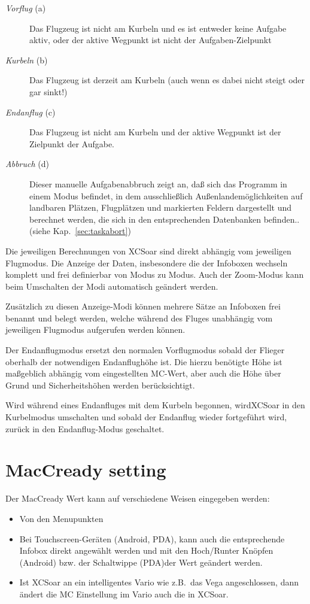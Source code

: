 \begin{description}
\item[\textit{Vorflug}  (a)]   Das Flugzeug ist nicht am Kurbeln  und es ist entweder keine Aufgabe aktiv, oder
der aktive Wegpunkt ist nicht der Aufgaben-Zielpunkt
\item[\textit{Kurbeln} (b)]  Das Flugzeug ist derzeit am Kurbeln (auch wenn es dabei nicht steigt oder gar sinkt!)
\item[\textit{Endanflug} (c)]  Das Flugzeug ist nicht am Kurbeln und der aktive Wegpunkt ist der Zielpunkt der Aufgabe.
\item[\textit{Abbruch} (d)]  Dieser manuelle Aufgabenabbruch zeigt an, daß sich das Programm in einem  Modus befindet, in dem ausschließlich Außenlandemöglichkeiten auf landbaren Plätzen, Flugplätzen und markierten Feldern  dargestellt und berechnet werden, die sich in den entsprechenden Datenbanken befinden.. 
(siehe Kap.~\ref{sec:taskabort})
\end{description}

Die jeweiligen Berechnungen von \textsf{XCSoar} sind direkt abhängig vom jeweiligen Flugmodus. Die
Anzeige der Daten, insbesondere die der Infoboxen wechseln komplett und frei definierbar von Modus zu
Modus. Auch der Zoom-Modus kann beim Umschalten der Modi automatisch geändert werden.

Zusätzlich zu diesen Anzeige-Modi können mehrere Sätze an Infoboxen frei benannt und belegt werden,
welche während des Fluges unabhängig vom jeweiligen Flugmodus aufgerufen werden können.

Der Endanflugmodus ersetzt den normalen Vorflugmodus sobald der Flieger oberhalb der notwendigen
Endanflughöhe ist. Die hierzu benötigte Höhe ist maßgeblich abhängig vom eingestellten MC-Wert, aber
auch die Höhe über Grund und Sicherheitshöhen werden berücksichtigt.

Wird während eines Endanfluges mit dem Kurbeln begonnen, wird\textsf{XCSoar} in den Kurbelmodus umschalten und
sobald der Endanflug wieder fortgeführt wird, zurück in den Endanflug-Modus geschaltet.

\section{MacCready setting}

Der  MacCready Wert kann auf verschiedene Weisen eingegeben werden:
\begin{itemize}
\item Von den Menupunkten
\begin{quote}
\blink{}

\blink{}
\end{quote}
\item Bei  Touchscreen-Geräten (Android, PDA), kann auch die entsprechende Infobox direkt angewählt
werden und mit den Hoch/Runter Knöpfen (Android) bzw. der Schaltwippe (PDA)der Wert geändert werden.
\item Ist \textsf{XCSoar} an ein intelligentes Vario wie z.B.\ das Vega angeschlossen, dann
ändert die MC Einstellung im Vario auch die in \textsf{XCSoar}.
\end{itemize}

